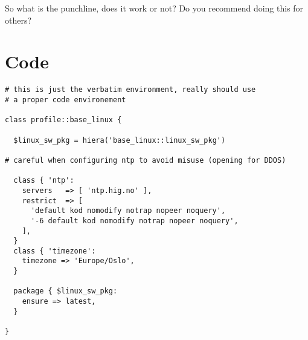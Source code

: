 So what is the punchline, does it work or not? Do you recommend doing this
for others?




\clearpage
\appendix

\section{Code}

\begin{verbatim}
# this is just the verbatim environment, really should use
# a proper code environement

class profile::base_linux {

  $linux_sw_pkg = hiera('base_linux::linux_sw_pkg')

# careful when configuring ntp to avoid misuse (opening for DDOS)

  class { 'ntp':
    servers   => [ 'ntp.hig.no' ],
    restrict  => [
      'default kod nomodify notrap nopeer noquery',
      '-6 default kod nomodify notrap nopeer noquery',
    ],
  }
  class { 'timezone':
    timezone => 'Europe/Oslo',
  }

  package { $linux_sw_pkg:
    ensure => latest,
  }

}
\end{verbatim}


